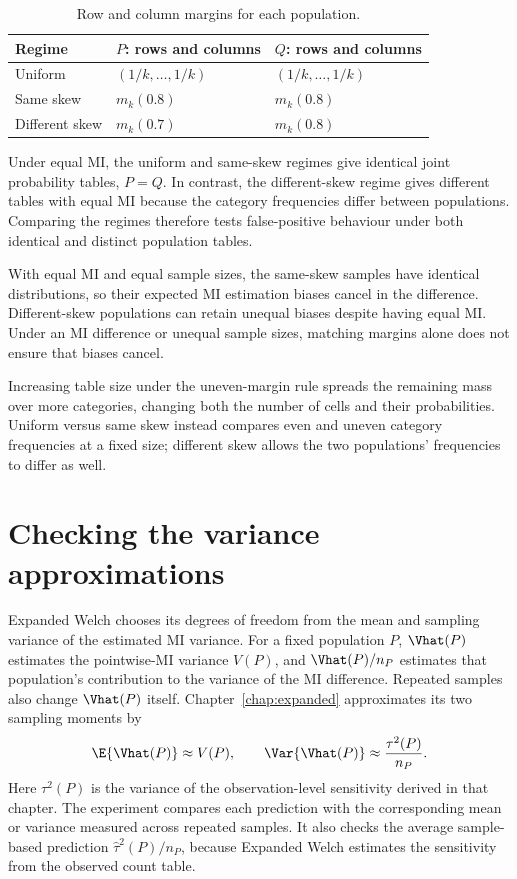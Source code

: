 \begin{table}[htbp]
\centering
\caption{Row and column margins for each population.}
\label{tab:margin-profiles}
\begin{tabular}{@{}lll@{}}
\toprule
Regime & \(P\): rows and columns & \(Q\): rows and columns\\
\midrule
Uniform & \((1/k,\ldots,1/k)\) & \((1/k,\ldots,1/k)\)\\
Same skew & \(m_k(0.8)\) & \(m_k(0.8)\)\\
Different skew & \(m_k(0.7)\) & \(m_k(0.8)\)\\
\bottomrule
\end{tabular}
\end{table}

Under equal MI, the uniform and same-skew regimes give identical joint
probability tables, \(P=Q\). In contrast, the different-skew regime gives
different tables with equal MI because the category frequencies differ
between populations. Comparing the regimes therefore tests false-positive
behaviour under both identical and distinct population tables.

With equal MI and equal sample sizes,
the same-skew samples have identical distributions, so their expected MI
estimation biases cancel in the difference. Different-skew populations can
retain unequal biases despite having equal MI. Under an MI difference or
unequal sample sizes, matching margins alone does not ensure that biases
cancel.

Increasing table size under the uneven-margin rule spreads the remaining
mass over more categories, changing both the number of cells and their
probabilities. Uniform versus same skew instead compares even
and uneven category frequencies at a fixed size; different skew allows the
two populations' frequencies to differ as well.



\section{Checking the variance approximations}

Expanded Welch chooses its degrees of freedom from the mean and sampling
variance of the estimated MI variance. For a fixed population \(P\),
\(\Vhat(P)\) estimates the pointwise-MI variance \(V(P)\), and
\(\Vhat(P)/n_P\) estimates that population's contribution to the variance
of the MI difference. Repeated samples also change \(\Vhat(P)\) itself.
Chapter~\ref{chap:expanded} approximates its two sampling moments by
\begin{equation}
 \E\{\Vhat(P)\}\approx V(P),\qquad
 \Var\{\Vhat(P)\}\approx\frac{\tau^2(P)}{n_P}.
 \label{eq:redesign-moment-approximations}
\end{equation}
Here \(\tau^2(P)\) is the variance of the observation-level sensitivity
derived in that chapter. The experiment compares each prediction with
the corresponding mean or variance measured across repeated samples.
It also checks the average sample-based prediction
\(\widehat\tau^2(P)/n_P\), because Expanded Welch estimates the sensitivity
from the observed count table.

